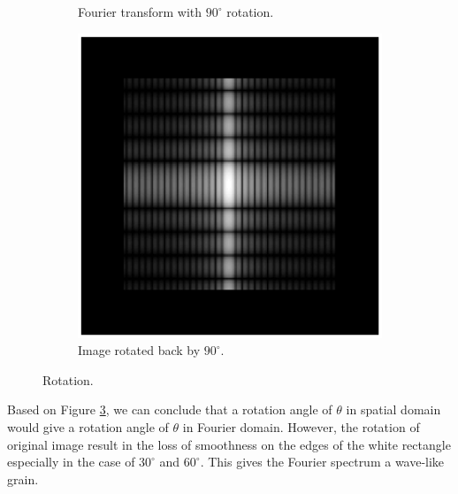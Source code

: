 \documentclass[11pt,a4paper]{article}
\begin{document}
\begin{itemize}
\begin{figure}[!ht]
\begin{subfigure}[t]{.32\linewidth}
		\caption{\scriptsize Fourier transform with $90^{\circ}$ rotation.}
		\label{fig:rotated90Fourier}
		\end{subfigure}
		\begin{subfigure}[t]{.32\linewidth} %
		\includegraphics[width=\columnwidth]{Rotation_G_90_Fourier_Back.eps}
		\caption{\scriptsize Image rotated back by $90^{\circ}$.}
		\label{fig:rotated90Back}
		\end{subfigure}	
		
		\caption{Rotation.}
		\label{fig:rotation}
	\end{figure}
	\par Based on Figure \ref{fig:rotation}, we can conclude that a rotation angle of $\theta$ in spatial domain would give a rotation angle of $\theta$ in Fourier domain. However, the rotation of original image result in the loss of smoothness on the edges of the white rectangle especially in the case of $30^{\circ}$ and $60^{\circ}$. This gives the Fourier spectrum a wave-like grain.
\end{itemize}
\end{document}
